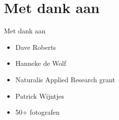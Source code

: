 \documentclass[]{beamer}
\begin{document}
\section*{Met dank aan}

    \begin{frame}{Met dank aan}

        \begin{itemize}
            \item Dave Roberts
            \item Hanneke de Wolf
            \item Naturalis Applied Research grant
            \item Patrick Wijntjes
            \item 50+ fotografen
        \end{itemize}
    \end{frame}
\end{document}

